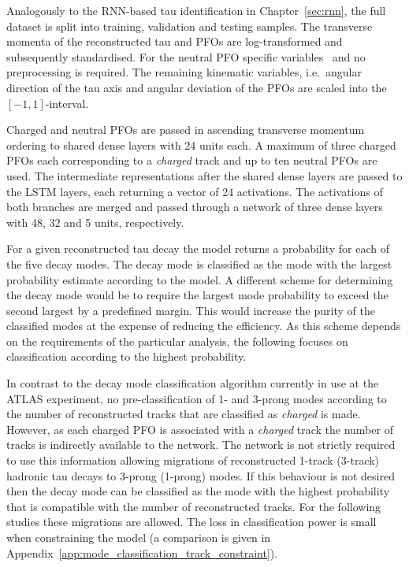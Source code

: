 Analogously to the RNN-based tau identification in Chapter~\ref{sec:rnn}, the
full dataset is split into training, validation and testing samples. The
transverse momenta of the reconstructed tau and PFOs are log-transformed and
subsequently standardised. For the neutral PFO specific
variables~ and
 no preprocessing is required. The
remaining kinematic variables, i.e.\ angular direction of the tau axis and
angular deviation of the PFOs are scaled into the~$[-1, 1]$-interval.

Charged and neutral PFOs are passed in ascending transverse momentum ordering
 to shared dense layers with 24 units each. A maximum of
three charged PFOs each corresponding to a \emph{charged} track and up to ten
neutral PFOs are used. The intermediate representations after the shared dense
layers are passed to the LSTM layers, each returning a vector of 24 activations.
The activations of both branches are merged and passed through a network of
three dense layers with 48, 32 and 5 units, respectively.

For a given reconstructed tau decay the model returns a probability for each of
the five decay modes. The decay mode is classified as the mode with the largest
probability estimate according to the model. A different scheme for determining
the decay mode would be to require the largest mode probability to exceed the
second largest by a predefined margin. This would increase the purity of the
classified modes at the expense of reducing the efficiency. As this scheme
depends on the requirements of the particular analysis, the following focuses on
classification according to the highest probability.

In contrast to the decay mode classification algorithm currently in use at the
ATLAS experiment, no pre-classification of 1- and 3-prong modes according to the
number of reconstructed tracks that are classified as \emph{charged} is made.
However, as each charged PFO is associated with a \emph{charged} track the
number of tracks is indirectly available to the network. The network is not
strictly required to use this information allowing migrations of reconstructed
1-track (3-track) hadronic tau decays to 3-prong (1-prong) modes. If this
behaviour is not desired then the decay mode can be classified as the mode with
the highest probability that is compatible with the number of reconstructed
tracks. For the following studies these migrations are allowed. The loss in
classification power is small when constraining the model (a comparison is given
in Appendix~\ref{app:mode_classification_track_constraint}).

